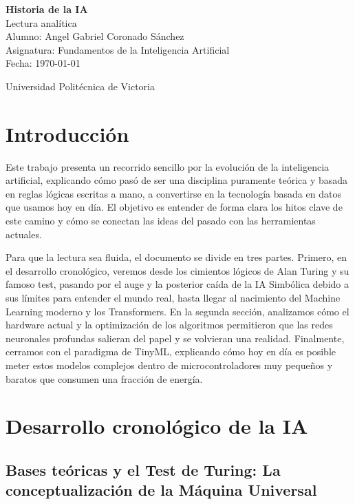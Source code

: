 \documentclass[12pt, a4paper]{article}
\begin{document}
\begin{titlepage}
    \centering
    {\huge \textbf{Historia de la IA}} \\[1cm]
    {\Large Lectura analítica} \\[2cm]
    
    {\large Alumno: Angel Gabriel Coronado Sánchez} \\[1cm]
    {\large Asignatura: Fundamentos de la Inteligencia Artificial} \\[1cm]
    {\large Fecha: \today}
    
    \vfill
    {\large Universidad Politécnica de Victoria}
\end{titlepage}

\tableofcontents

\newpage

\section{Introducción}

Este trabajo presenta un recorrido sencillo por la evolución de la inteligencia artificial, explicando cómo pasó de ser una disciplina puramente teórica y basada en reglas lógicas escritas a mano, a convertirse en la tecnología basada en datos que usamos hoy en día. El objetivo es entender de forma clara los hitos clave de este camino y cómo se conectan las ideas del pasado con las herramientas actuales.

Para que la lectura sea fluida, el documento se divide en tres partes. Primero, en el desarrollo cronológico, veremos desde los cimientos lógicos de Alan Turing y su famoso test, pasando por el auge y la posterior caída de la IA Simbólica debido a sus límites para entender el mundo real, hasta llegar al nacimiento del Machine Learning moderno y los Transformers. En la segunda sección, analizamos cómo el hardware actual y la optimización de los algoritmos permitieron que las redes neuronales profundas salieran del papel y se volvieran una realidad. Finalmente, cerramos con el paradigma de TinyML, explicando cómo hoy en día es posible meter estos modelos complejos dentro de microcontroladores muy pequeños y baratos que consumen una fracción de energía.

\section{Desarrollo cronológico de la IA}

\subsection{Bases teóricas y el Test de Turing: La conceptualización de la Máquina Universal}
\end{document}
